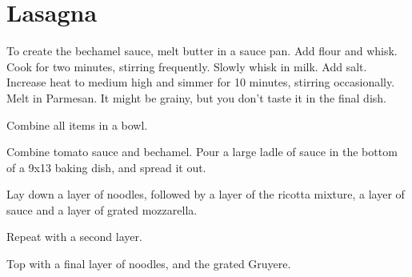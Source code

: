 \section{Lasagna}

\begin{recipe}



To create the bechamel sauce, melt butter in a sauce pan. Add flour and whisk. Cook for two minutes, stirring frequently. Slowly whisk in milk. Add salt. Increase heat to medium high and simmer for 10 minutes, stirring occasionally. Melt in Parmesan. It might be grainy, but you don't taste it in the final dish.


Combine all items in a bowl.


Combine tomato sauce and bechamel. Pour a large ladle of sauce in the bottom of a 9x13 baking dish, and spread it out.

Lay down a layer of noodles, followed by a layer of the ricotta mixture, a layer of sauce and a layer of grated mozzarella.

Repeat with a second layer.


Top with a final layer of noodles, and the grated Gruyere.


\end{recipe}
